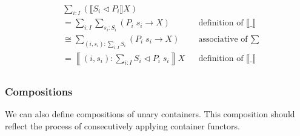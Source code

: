 \begin{code}%
\>[0]\AgdaSpace{}%
\AgdaSymbol{:}\AgdaSpace{}%
\AgdaSymbol{(}\AgdaSpace{}%
\AgdaSpace{}%
\AgdaSymbol{)}\AgdaSpace{}%
\AgdaSpace{}%
\<%
\\
\>[0]\AgdaSpace{}%
\AgdaSymbol{\{}\AgdaSymbol{\}}\AgdaSpace{}%
\AgdaSpace{}%
\AgdaSymbol{=}\AgdaSpace{}%
\AgdaSymbol{(}\AgdaFunction{Σ[}\AgdaSpace{}%
\AgdaSpace{}%
\AgdaSpace{}%
\AgdaSpace{}%
\AgdaFunction{]}\AgdaSpace{}%
\AgdaSpace{}%
\AgdaSpace{}%
\AgdaSymbol{)}\AgdaSpace{}%
\AgdaSpace{}%
\AgdaSpace{}%
\AgdaSymbol{(}\AgdaSpace{}%
\AgdaOperator{\AgdaInductiveConstructor{,}}\AgdaSpace{}%
\AgdaSymbol{)}\AgdaSpace{}%
\AgdaSpace{}%
\AgdaSpace{}%
\AgdaSpace{}%
\AgdaSpace{}%
\<%
\end{code}

\begin{align*}
& \sum_{i : I} (\llbracket S_i \triangleleft P_i \rrbracket X) \\
&= \sum_{i : I} \sum_{s_i : S_i} (P_i \; s_i \to X) && \text{definition of $\llbracket \_ \rrbracket$} \\
&\cong \sum_{(i , s_i) : \sum_{i : I} S_i} (P_i \; s_i \to X) && \text{associative of $\sum$} \\
&= \left\llbracket (i , s_i) : \sum_{i : I} S_i \triangleleft P_i \; s_i \right\rrbracket X && \text{definition of $\llbracket \_ \rrbracket$} \\
\end{align*}

\subsubsection*{Compositions}

We can also define compositions of unary containers. This composition should reflect the process of consecutively applying container functors.

